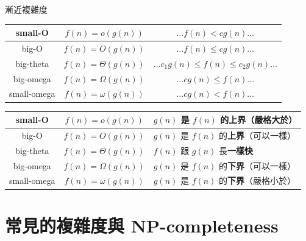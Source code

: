 \documentclass[aspectratio=169]{beamer}
\begin{document}
\begin{frame}{漸近複雜度}
  \begin{center}
    \bgroup
      \def\arraystretch{1.3}
      \setlength\tabcolsep{1em}
       {
        \begin{tabular}[pos]{| c | c | c |}
          \hline
          small-O     & $f(n) = o(g(n))$      & $\dots f(n) < cg(n) \dots$                 \\\hline
          \rowcolor{lime!50!gray!30!white}
          big-O       & $f(n) = O(g(n))$      & $\dots f(n) \le cg(n) \dots$               \\\hline
          big-theta   & $f(n) = \Theta(g(n))$ & $\dots c_1g(n) \le f(n) \le c_2g(n) \dots$ \\\hline
          big-omega   & $f(n) = \Omega(g(n))$ & $\dots cg(n) \le f(n) \dots$               \\\hline
          small-omega & $f(n) = \omega(g(n))$ & $\dots cg(n) < f(n) \dots$                 \\\hline
        \end{tabular}
      }
       {
        \begin{tabular}[pos]{| c | c | l |}
          \hline
          small-O     & $f(n) = o(g(n))$      & $g(n)$ 是 $f(n)$ 的\textbf{上界}（嚴格大於） \\\hline
          \rowcolor{lime!50!gray!30!white}
          big-O       & $f(n) = O(g(n))$      & $g(n)$ 是 $f(n)$ 的\textbf{上界}（可以一樣） \\\hline
          big-theta   & $f(n) = \Theta(g(n))$ & $f(n)$ 跟 $g(n)$ 長\textbf{一樣快}          \\\hline
          big-omega   & $f(n) = \Omega(g(n))$ & $g(n)$ 是 $f(n)$ 的\textbf{下界}（可以一樣） \\\hline
          small-omega & $f(n) = \omega(g(n))$ & $g(n)$ 是 $f(n)$ 的\textbf{下界}（嚴格小於） \\\hline
        \end{tabular}
      }
    \egroup
  \end{center}
\end{frame}


\section{常見的複雜度與 NP-completeness}
\end{document}
